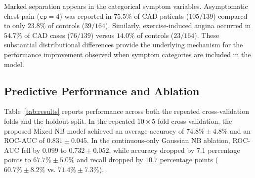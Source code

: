 \documentclass[conference]{IEEEtran}
\begin{document}
Marked separation appears in the categorical symptom variables. Asymptomatic chest pain ($\texttt{cp}=4$) was reported in $75.5\%$ of CAD patients ($105/139$) compared to only $23.8\%$ of controls ($39/164$). Similarly, exercise-induced angina occurred in $54.7\%$ of CAD cases ($76/139$) versus $14.0\%$ of controls ($23/164$). These substantial distributional differences provide the underlying mechanism for the performance improvement observed when symptom categories are included in the model.

\subsection{Predictive Performance and Ablation}
Table~\ref{tab:results} reports performance across both the repeated cross-validation folds and the holdout split. In the repeated $10 \times 5$-fold cross-validation, the proposed Mixed NB model achieved an average accuracy of $74.8\%\pm4.8\%$ and an ROC-AUC of $0.831\pm0.045$. In the continuous-only Gaussian NB ablation, ROC-AUC fell by $0.099$ to $0.732\pm0.052$, while accuracy dropped by $7.1$ percentage points to $67.7\%\pm5.0\%$ and recall dropped by $10.7$ percentage points ($60.7\%\pm8.2\%$ vs. $71.4\%\pm7.3\%$).
\end{document}
